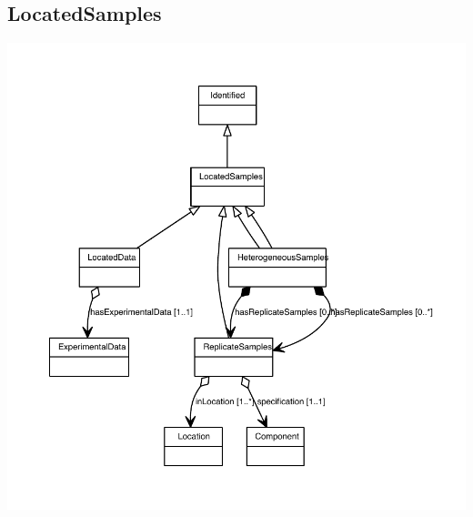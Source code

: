 \subsection{LocatedSamples}
\label{sec:LocatedSamples}


\begin{center}
\includegraphics[scale=0.8]{uml/HeterogeneousSamples_abstraction_hierarchy.pdf}
\end{center}



